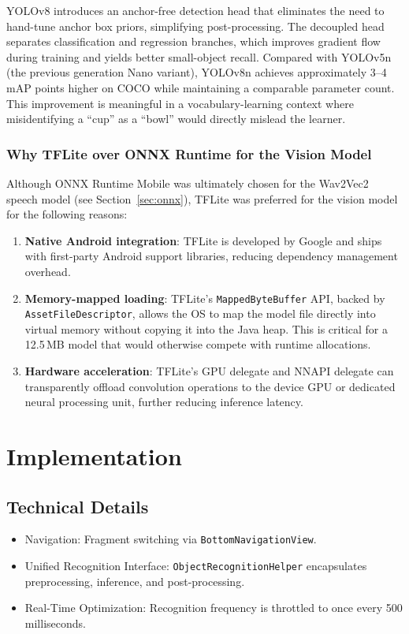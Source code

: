\documentclass[a4paper, 12pt]{article}
\begin{document}
    YOLOv8 introduces an anchor-free detection head that eliminates the need to hand-tune anchor box priors, simplifying post-processing. The decoupled head separates classification and regression branches, which improves gradient flow during training and yields better small-object recall. Compared with YOLOv5n (the previous generation Nano variant), YOLOv8n achieves approximately 3--4 mAP points higher on COCO while maintaining a comparable parameter count. This improvement is meaningful in a vocabulary-learning context where misidentifying a ``cup'' as a ``bowl'' would directly mislead the learner.

    \subsubsection{Why TFLite over ONNX Runtime for the Vision Model}

    Although ONNX Runtime Mobile was ultimately chosen for the Wav2Vec2 speech model (see Section~\ref{sec:onnx}), TFLite was preferred for the vision model for the following reasons:

    \begin{enumerate}
        \item \textbf{Native Android integration}: TFLite is developed by Google and ships with first-party Android support libraries, reducing dependency management overhead.
        \item \textbf{Memory-mapped loading}: TFLite's \texttt{MappedByteBuffer} API, backed by \texttt{AssetFileDescriptor}, allows the OS to map the model file directly into virtual memory without copying it into the Java heap. This is critical for a 12.5\,MB model that would otherwise compete with runtime allocations.
        \item \textbf{Hardware acceleration}: TFLite's GPU delegate and NNAPI delegate can transparently offload convolution operations to the device GPU or dedicated neural processing unit, further reducing inference latency.
    \end{enumerate}

    \section{Implementation}

    \subsection{Technical Details}
    \begin{itemize}
        \item Navigation: Fragment switching via \texttt{BottomNavigationView}.
        \item Unified Recognition Interface: \texttt{ObjectRecognitionHelper} encapsulates preprocessing, inference, and post-processing.
        \item Real-Time Optimization: Recognition frequency is throttled to once every 500 milliseconds.
    \end{itemize}
\end{document}
